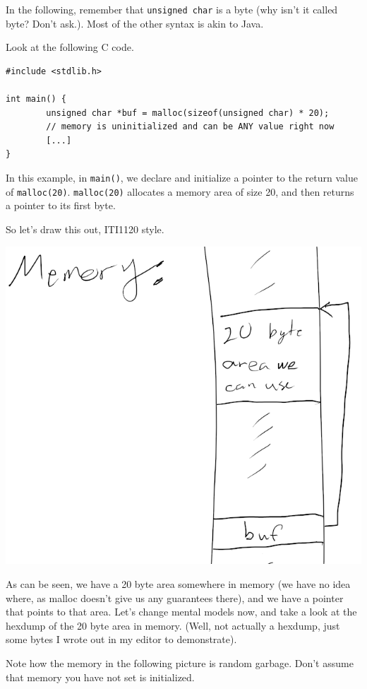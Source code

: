 \documentclass[11pt]{article}
\begin{document}
In the following, remember that \texttt{unsigned char} is a byte (why
isn't it called byte? Don't ask.). Most of the other syntax is
akin to Java.

Look at the following C code.
\begin{verbatim}
#include <stdlib.h>

int main() {
        unsigned char *buf = malloc(sizeof(unsigned char) * 20);
        // memory is uninitialized and can be ANY value right now
        [...]
}
\end{verbatim}
In this example, in \texttt{main()}, we declare and initialize a pointer
to the return value of \texttt{malloc(20)}. \texttt{malloc(20)} allocates a memory
area of size 20, and then returns a pointer to its first byte.

So let's draw this out, ITI1120 style.

\begin{center}
\includegraphics[width=.9\linewidth]{./imgs/buf.png}
\end{center}

As can be seen, we have a 20 byte area somewhere in memory (we
have no idea where, as malloc doesn't give us any guarantees
there), and we have a pointer that points to that area. Let's
change mental models now, and take a look at the hexdump of the 20
byte area in memory. (Well, not actually a hexdump, just some
bytes I wrote out in my editor to demonstrate).

Note how the memory in the following picture is random
garbage. Don't assume that memory you have not set is initialized.
\end{document}

